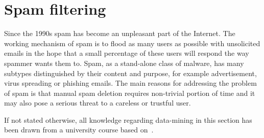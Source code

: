 \documentclass[english,cover]{fitthesis} %
\newcommand{\todo}[1]{{\color{red}#1}}
\begin{document}

\section{Spam filtering}
Since the 1990s spam has become an unpleasant part of the Internet. The working mechanism of spam is to flood as many users as possible with unsolicited emails in the hope that a small percentage of these users will respond the way spammer wants them to. Spam, as a stand-alone class of malware, has many subtypes distinguished by their content and purpose, for example advertisement, virus spreading or phishing emails. The main reasons for addressing the problem of spam is that manual spam deletion requires non-trivial portion of time and it may also pose a serious threat to a careless or trustful user.

If not stated otherwise, all knowledge regarding data-mining in this section has been drawn from a university course based on~\cite{han_datamining}.
\end{document}
